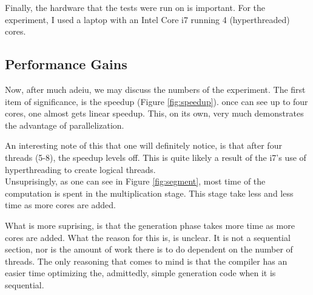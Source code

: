 \documentclass[11pt]{article}
\begin{document}
Finally, the hardware that the tests were run on is important. For the
experiment, I used a laptop with an Intel Core i7 running 4 (hyperthreaded)
cores.
\subsection{Performance Gains}
Now, after much adeiu, we may discuss the numbers of the experiment. The first
item of significance, is the speedup (Figure \ref{fig:speedup}). once can see up to
four cores, one almost gets linear speedup. This, on its own, very much
demonstrates the advantage of parallelization.

An interesting note of this that one will definitely notice, is that after four
threads (5-8), the speedup levels off. This is quite likely a result of the
i7's use of hyperthreading to create logical threads.\\

Unsuprisingly, as one can see in Figure \ref{fig:segment}, most time of the
computation is spent in the multiplication stage. This stage take less and less
time as more cores are added.

What is more suprising, is that the generation phase takes more time as more
cores are added. What the reason for this is, is unclear. It is not a
sequential section, nor is the amount of work there is to do dependent on the
number of threads. The only reasoning that comes to mind is that the compiler
has an easier time optimizing the, admittedly, simple generation code when it
is sequential.
\end{document}
